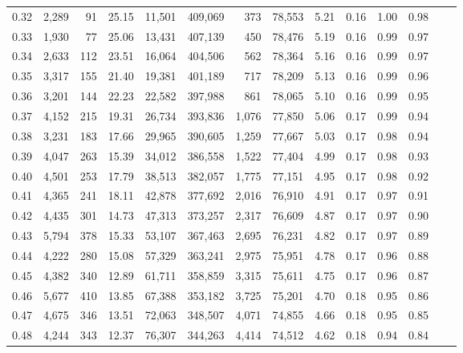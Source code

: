 \begin{tabular}{rrrrrrrrrrrrrr}
0.32 &   2,289 &     91 &   25.15 &   11,501 &  409,069 &     373 &  78,553 &  5.21 &  0.16 &  1.00 &      0.98 \\
0.33 &   1,930 &     77 &   25.06 &   13,431 &  407,139 &     450 &  78,476 &  5.19 &  0.16 &  0.99 &      0.97 \\
0.34 &   2,633 &    112 &   23.51 &   16,064 &  404,506 &     562 &  78,364 &  5.16 &  0.16 &  0.99 &      0.97 \\
0.35 &   3,317 &    155 &   21.40 &   19,381 &  401,189 &     717 &  78,209 &  5.13 &  0.16 &  0.99 &      0.96 \\
0.36 &   3,201 &    144 &   22.23 &   22,582 &  397,988 &     861 &  78,065 &  5.10 &  0.16 &  0.99 &      0.95 \\
0.37 &   4,152 &    215 &   19.31 &   26,734 &  393,836 &   1,076 &  77,850 &  5.06 &  0.17 &  0.99 &      0.94 \\
0.38 &   3,231 &    183 &   17.66 &   29,965 &  390,605 &   1,259 &  77,667 &  5.03 &  0.17 &  0.98 &      0.94 \\
0.39 &   4,047 &    263 &   15.39 &   34,012 &  386,558 &   1,522 &  77,404 &  4.99 &  0.17 &  0.98 &      0.93 \\
0.40 &   4,501 &    253 &   17.79 &   38,513 &  382,057 &   1,775 &  77,151 &  4.95 &  0.17 &  0.98 &      0.92 \\
0.41 &   4,365 &    241 &   18.11 &   42,878 &  377,692 &   2,016 &  76,910 &  4.91 &  0.17 &  0.97 &      0.91 \\
0.42 &   4,435 &    301 &   14.73 &   47,313 &  373,257 &   2,317 &  76,609 &  4.87 &  0.17 &  0.97 &      0.90 \\
0.43 &   5,794 &    378 &   15.33 &   53,107 &  367,463 &   2,695 &  76,231 &  4.82 &  0.17 &  0.97 &      0.89 \\
0.44 &   4,222 &    280 &   15.08 &   57,329 &  363,241 &   2,975 &  75,951 &  4.78 &  0.17 &  0.96 &      0.88 \\
0.45 &   4,382 &    340 &   12.89 &   61,711 &  358,859 &   3,315 &  75,611 &  4.75 &  0.17 &  0.96 &      0.87 \\
0.46 &   5,677 &    410 &   13.85 &   67,388 &  353,182 &   3,725 &  75,201 &  4.70 &  0.18 &  0.95 &      0.86 \\
0.47 &   4,675 &    346 &   13.51 &   72,063 &  348,507 &   4,071 &  74,855 &  4.66 &  0.18 &  0.95 &      0.85 \\
0.48 &   4,244 &    343 &   12.37 &   76,307 &  344,263 &   4,414 &  74,512 &  4.62 &  0.18 &  0.94 &      0.84 \\

\end{tabular}
